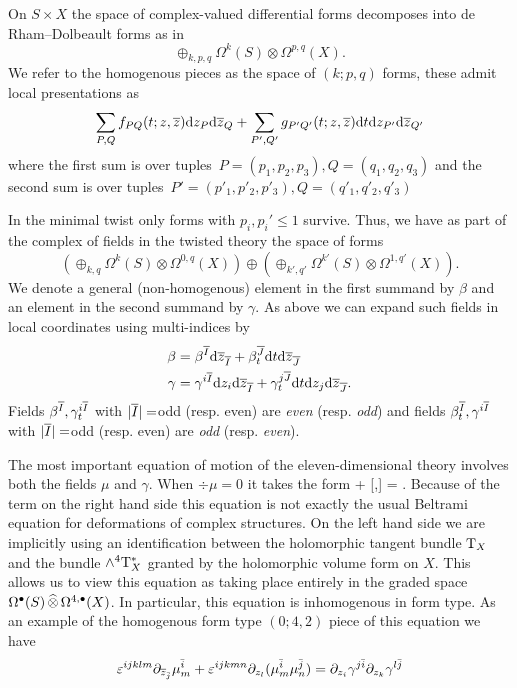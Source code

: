 On $S \times X$ the space of complex-valued differential forms decomposes into de Rham--Dolbeault forms as in
\[
\oplus_{k,p,q} \Omega^k(S) \otimes \Omega^{p,q}(X) .
\]
We refer to the homogenous pieces as the space of $(k;p,q)$ forms, these admit local presentations as
\[
\sum_{P,Q} f_{PQ} (t;z,\zbar) \d z_P \d \zbar_Q + \sum_{P',Q'} g_{P'Q'}(t;z,\zbar) \d t \d z_{P'}\d \zbar_{Q'} 
\]
where the first sum is over tuples~$P=(p_1,p_2,p_3),Q=(q_1,q_2,q_3)$ and
the second sum is over tuples~$P'=(p'_1,p'_2,p'_3),Q=(q'_1,q'_2,q'_3)$

In the minimal twist only forms with $p_i ,p_i'\leq 1$ survive. 
Thus, we have as part of the complex of fields in the twisted theory the space of forms
\[
\left(\oplus_{k,q} \Omega^k(S) \otimes \Omega^{0,q}(X)\right) \oplus 
\left(\oplus_{k',q'} \Omega^{k'}(S) \otimes \Omega^{1,q'}(X)\right) .
\]
We denote a general (non-homogenous) element in the first summand by $\beta$ and an element in the second summand by $\gamma$.
As above we can expand such fields in local coordinates using multi-indices by 
\begin{align*}
\beta & = \beta^{\Bar{I}} \d \zbar_{\Bar{I}} + \beta_t^{\Bar{J}} \d t \d \zbar_{\Bar{J}}\\
\gamma & = \gamma^{i \Bar{I}} \d z_i \d \zbar_{\Bar{I}} + \gamma_t^{j \Bar{J}} \d t \d z_j \d \zbar_{\Bar{J}}.
\end{align*}
Fields $\beta^{\Bar{I}}, \gamma_t^{i \Bar{I}}$ with $|\Bar{I}| = $odd (resp. even) are {\em even} (resp. {\em odd}) and fields $\beta_t^{\Bar{I}}, \gamma^{i \Bar{I}}$ with $|\Bar{I}| = $odd (resp. even) are {\em odd} (resp. {\em even}). 

The most important equation of motion of the eleven-dimensional theory involves both the fields $\mu$ and $\gamma$. 
When $\div \mu = 0$ it takes the form
\beqn\label{eqn:eom2}
\dbar \mu +  [\mu,\mu] = \del \gamma \del \gamma .
\eeqn
Because of the term on the right hand side this equation is not exactly the usual Beltrami equation for deformations of complex structures.
On the left hand side we are implicitly using an identification between the holomorphic tangent bundle $\T_X$ and the bundle $\wedge^4 \T^*_X$ granted by the holomorphic volume form on $X$.
This allows us to view this equation as taking place entirely in the graded space $\Omega^\bu(S) \hotimes \Omega^{4,\bu}(X)$. 
In particular, this equation is inhomogenous in form type.
As an example of the homogenous form type $(0;4,2)$ piece of this equation we have 
\[
\ep^{ijklm} \del_{\zbar_{\bar{j}}} \mu_m^{\bar{i}} + \ep^{ijkmn} \del_{z_l} (\mu^{\bar{i}}_{m} \mu^{\bar{j}}_{n}) =\del_{z_i} \gamma^{j \bar{i}} \del_{z_k} \gamma^{l \bar{j}} 
\]

